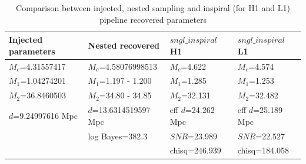 \documentclass[epsf]{article}
\begin{document}
\begin{table}[ht]
 \begin{tabular}{|l|l|l|l|}
 \hline
 \hline
 Injected parameters & Nested recovered & $sngl\_inspiral$ H1 & $sngl\_inspiral$ L1 \\
 \hline
 \hline
 $M_c$=4.31557417 & $M_c$=4.58076998513 & $M_c$=4.622 & $M_c$=4.574 \\
 $M_1$=1.04274201 & $M_1$=1.197 - 1.200 & $M_1$=1.285 & $M_1$=1.253 \\
 $M_2$=36.8460503 & $M_2$=34.80 - 34.85 & $M_2$=32.131 & $M_2$=32.482 \\
 $d$=9.24997616 Mpc & $d$=13.6314519597 Mpc & eff $d$=24.262 Mpc & eff $d$=25.189 Mpc \\
 \hline
                   &  log Bayes=382.3 & $SNR$=23.989 & $SNR$=22.527 \\
 \hline
                   &                  & chisq=246.939 & chisq=184.058 \\
 \hline
 \hline
 \end{tabular} 
 \caption{Comparison between injected, nested sampling and inspiral (for H1 and L1) pipeline recovered parameters}
 \label{Table 5}
\end{table}   
\end{document}
